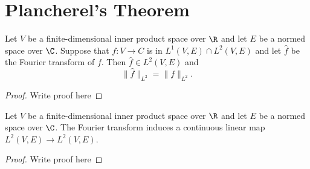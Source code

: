 \chapter{Plancherel's Theorem}
\label{chap:plancherel}


\begin{theorem}
  \label{lem:plancherel}
  \uses{}
  \leanok %
  Let $V$ be a finite-dimensional inner product space over $\R$ and let $E$ be a normed space over $\C$. Suppose that $f : V \to C$ is in $L^1(V,E)\cap L^2(V,E)$ and let $\widehat{f}$ be the Fourier transform of $f$. Then $\widehat{f}\in L^2(V,E)$ and
  \[\|\widehat{f}\|_{L^2} = \|f\|_{L^2}.\]
  \end{theorem}
    \begin{proof}
    Write proof here
\end{proof}

\begin{corollary}
  \label{lem:fourier-is-l2-linear}
  \leanok %
  Let $V$ be a finite-dimensional inner product space over $\R$ and let $E$ be a normed space over $\C$. The Fourier transform induces a continuous linear map $L^2(V,E) \to L^2(V,E)$.
  \end{corollary}
  \begin{proof}
    Write proof here
\end{proof}